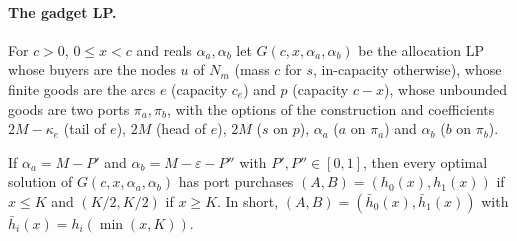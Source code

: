 \paragraph{The gadget LP.} For $c>0$, $0\le x<c$ and reals $\alpha_a,\alpha_b$ let
$G(c,x,\alpha_a,\alpha_b)$ be the allocation LP whose buyers are the nodes $u$ of $N_m$ (mass $c$ for
$s$, in-capacity otherwise), whose finite goods are the arcs $e$ (capacity $c_e$) and $p$ (capacity
$c-x$), whose unbounded goods are two ports $\pi_a,\pi_b$, with the options of the construction and
coefficients $2M-\kappa_e$ (tail of $e$), $2M$ (head of $e$), $2M$ ($s$ on $p$), $\alpha_a$ ($a$ on
$\pi_a$) and $\alpha_b$ ($b$ on $\pi_b$).

\begin{lemma}\label{lem:sh-gadget}
\statuslean
If $\alpha_a=M-P'$ and $\alpha_b=M-\varepsilon-P''$ with $P',P''\in[0,1]$, then every optimal solution of
$G(c,x,\alpha_a,\alpha_b)$ has port purchases $(A,B)=(h_0(x),h_1(x))$ if $x\le K$ and $(K/2,K/2)$ if
$x\ge K$. In short, $(A,B)=(\bar h_0(x),\bar h_1(x))$ with $\bar h_i(x)=h_i(\min(x,K))$.
\end{lemma}

